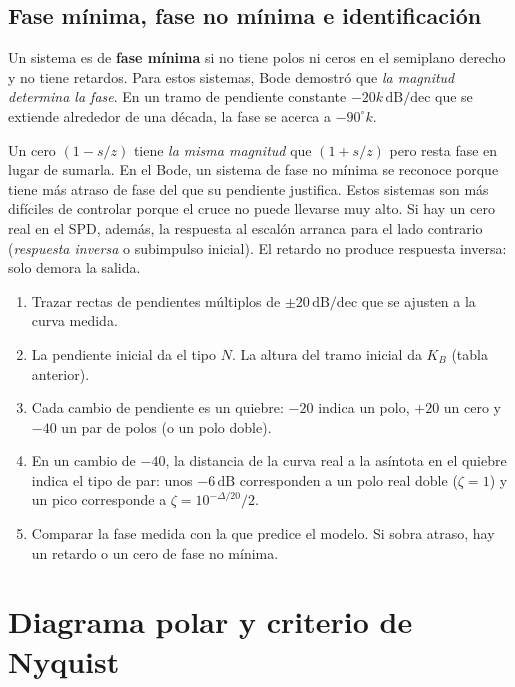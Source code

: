 \documentclass[11pt,a4paper]{article}
\newcommand{\dB}{\,\mathrm{dB}}
\newcommand{\dBdec}{\,\mathrm{dB/dec}}
\begin{document}
\subsection{Fase mínima, fase no mínima e identificación}
Un sistema es de \textbf{fase mínima} si no tiene polos ni ceros en el semiplano derecho y no tiene retardos.
Para estos sistemas, Bode demostró que \emph{la magnitud determina la fase}. En un tramo de pendiente constante
$-20k\dBdec$ que se extiende alrededor de una década, la fase se acerca a $-90^\circ k$.

Un cero $(1-s/z)$ tiene \emph{la misma magnitud} que $(1+s/z)$ pero resta fase en lugar de sumarla.
En el Bode, un sistema de fase no mínima se reconoce porque tiene más atraso de fase del que su pendiente justifica.
Estos sistemas son más difíciles de controlar porque el cruce no puede llevarse muy alto. Si hay un cero real en el SPD,
además, la respuesta al escalón arranca para el lado contrario (\emph{respuesta inversa} o subimpulso inicial). El retardo no produce
respuesta inversa: solo demora la salida.

\begin{receta}
\begin{enumerate}[label=\textbf{\arabic*.}]
\item Trazar rectas de pendientes múltiplos de $\pm20\dBdec$ que se ajusten a la curva medida.
\item La pendiente inicial da el tipo $N$. La altura del tramo inicial da $K_B$ (tabla anterior).
\item Cada cambio de pendiente es un quiebre: $-20$ indica un polo, $+20$ un cero y $-40$ un par de polos
      (o un polo doble).
\item En un cambio de $-40$, la distancia de la curva real a la asíntota en el quiebre indica el tipo de par:
      unos $-6\dB$ corresponden a un polo real doble ($\zeta=1$) y un pico corresponde a $\zeta=10^{-\Delta/20}/2$.
\item Comparar la fase medida con la que predice el modelo. Si sobra atraso, hay un retardo o un cero de fase no mínima.
\end{enumerate}
\end{receta}

\section{Diagrama polar y criterio de Nyquist}
\end{document}
